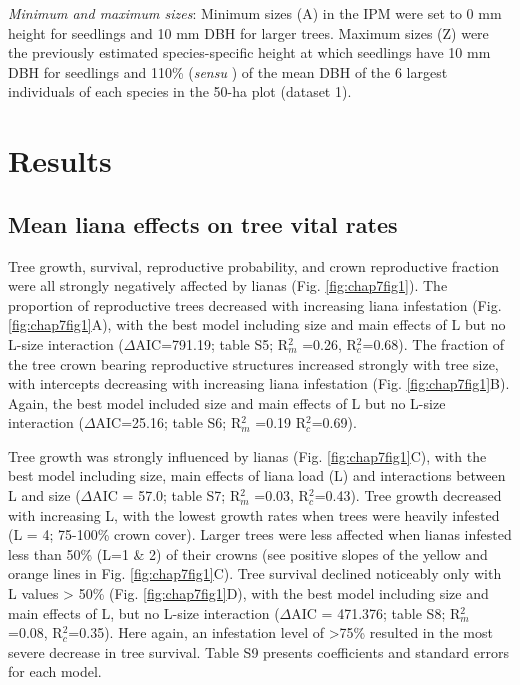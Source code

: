 \documentclass[b5paper,justified]{tufte-book} %
\begin{document}
\begin{fullwidth}
\textit{Minimum and maximum sizes}: Minimum sizes (A) in the IPM were set to 0 mm height for seedlings and 10 mm DBH for larger trees. Maximum sizes (Z) were the previously estimated species-specific height at which seedlings have 10 mm DBH for seedlings and 110\% (\emph{sensu} \citealt{Zuidema2010}) of the mean DBH of the 6 largest individuals of each species in the 50-ha plot (dataset 1). 


\section{Results}

\subsection{Mean liana effects on tree vital rates}
Tree growth, survival, reproductive probability, and crown reproductive fraction were all strongly negatively affected by lianas (Fig. \ref{fig:chap7fig1}). The proportion of reproductive trees decreased with increasing liana infestation (Fig. \ref{fig:chap7fig1}A), with the best model including size and main effects of L but no L-size interaction ($\Delta$AIC=791.19; table S5; R$^2_m$ =0.26, R$^2_c$=0.68). The fraction of the tree crown bearing reproductive structures increased strongly with tree size, with intercepts decreasing with increasing liana infestation (Fig. \ref{fig:chap7fig1}B). Again, the best model included size and main effects of L but no L-size interaction ($\Delta$AIC=25.16; table S6; R$^2_m$ =0.19 R$^2_c$=0.69). 

Tree growth was strongly influenced by lianas (Fig. \ref{fig:chap7fig1}C), with the best model including size, main effects of liana load (L) and interactions between L and size ($\Delta$AIC = 57.0; table S7; R$^2_m$ =0.03, R$^2_c$=0.43). Tree growth decreased with increasing L, with the lowest growth rates when trees were heavily infested (L = 4; 75-100\% crown cover). Larger trees were less affected when lianas infested less than 50\% (L=1 \& 2) of their crowns (see positive slopes of the yellow and orange lines in Fig. \ref{fig:chap7fig1}C).  
Tree survival declined noticeably only with L values > 50\% (Fig. \ref{fig:chap7fig1}D), with the best model including size and main effects of L, but no L-size interaction ($\Delta$AIC = 471.376; table S8; R$^2_m$ =0.08, R$^2_c$=0.35). Here again, an infestation level of >75\% resulted in the most severe decrease in tree survival. Table S9 presents coefficients and standard errors for each model.


\end{fullwidth}
\end{document}
